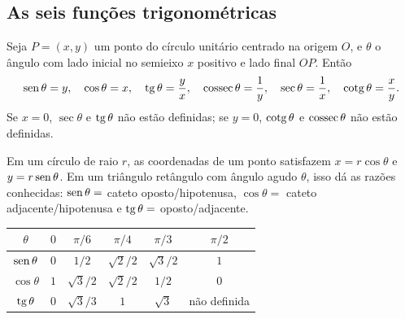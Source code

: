 \subsection{As seis funções trigonométricas}

\begin{definicao}
Seja $P=(x,y)$ um ponto do círculo unitário centrado na origem $O$, e $\theta$ o ângulo
com lado inicial no semieixo $x$ positivo e lado final $OP$. Então
\[
\operatorname{sen}\theta=y,\quad \cos\theta=x,\quad \operatorname{tg}\theta=\frac yx,\quad
\operatorname{cossec}\theta=\frac1y,\quad \sec\theta=\frac1x,\quad \operatorname{cotg}\theta=\frac xy .
\]
Se $x=0$, $\sec\theta$ e $\operatorname{tg}\theta$ não estão definidas; se $y=0$, $\operatorname{cotg}\theta$ e
$\operatorname{cossec}\theta$ não estão definidas.
\end{definicao}


Em um círculo de raio $r$, as coordenadas de um ponto satisfazem $x=r\cos\theta$ e
$y=r\operatorname{sen}\theta$. Em um triângulo retângulo com ângulo agudo $\theta$, isso dá as razões
conhecidas: $\operatorname{sen}\theta=$ cateto oposto/hipotenusa, $\cos\theta=$ cateto
adjacente/hipotenusa e $\operatorname{tg}\theta=$ oposto/adjacente.

\begin{center}
\renewcommand{\arraystretch}{1.3}
\begin{tabular}{@{}c|ccccc@{}}\toprule
$\theta$ & $0$ & $\pi/6$ & $\pi/4$ & $\pi/3$ & $\pi/2$\\\midrule
$\operatorname{sen}\theta$ & $0$ & $1/2$ & $\sqrt2/2$ & $\sqrt3/2$ & $1$\\
$\cos\theta$ & $1$ & $\sqrt3/2$ & $\sqrt2/2$ & $1/2$ & $0$\\
$\operatorname{tg}\theta$ & $0$ & $\sqrt3/3$ & $1$ & $\sqrt3$ & não definida\\\bottomrule
\end{tabular}
\end{center}


